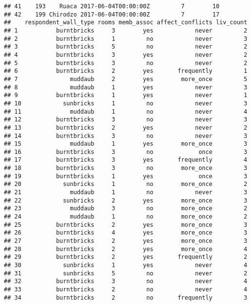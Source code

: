 \documentclass[
]{article}
\begin{document}
\begin{verbatim}
## 41    193    Ruaca 2017-06-04T00:00:00Z         7        10
## 42    199 Chirodzo 2017-06-04T00:00:00Z         7        17
##    respondent_wall_type rooms memb_assoc affect_conflicts liv_count
## 1           burntbricks     3        yes            never         2
## 2           burntbricks     1         no            never         3
## 3           burntbricks     5         no            never         2
## 4           burntbricks     3        yes            never         2
## 5           burntbricks     3         no            never         2
## 6           burntbricks     2        yes       frequently         1
## 7               muddaub     2        yes        more_once         5
## 8               muddaub     1        yes            never         3
## 9           burntbricks     1        yes            never         1
## 10            sunbricks     1         no            never         3
## 11              muddaub     1         no            never         4
## 12          burntbricks     3         no            never         3
## 13          burntbricks     2        yes            never         2
## 14          burntbricks     3         no            never         3
## 15              muddaub     1        yes        more_once         3
## 16          burntbricks     3         no             once         3
## 17          burntbricks     3        yes       frequently         4
## 18          burntbricks     3         no        more_once         3
## 19          burntbricks     1        yes             once         3
## 20            sunbricks     1         no        more_once         2
## 21              muddaub     1         no            never         3
## 22            sunbricks     2        yes        more_once         3
## 23              muddaub     3         no        more_once         2
## 24              muddaub     1         no        more_once         2
## 25          burntbricks     2        yes        more_once         3
## 26          burntbricks     4        yes        more_once         3
## 27          burntbricks     2        yes        more_once         3
## 28          burntbricks     2        yes        more_once         4
## 29          burntbricks     2        yes       frequently         2
## 30            sunbricks     1        yes            never         4
## 31            sunbricks     5         no            never         2
## 32          burntbricks     3         no            never         4
## 33          burntbricks     2         no            never         4
## 34          burntbricks     2         no       frequently         3

\end{verbatim}
\end{document}
